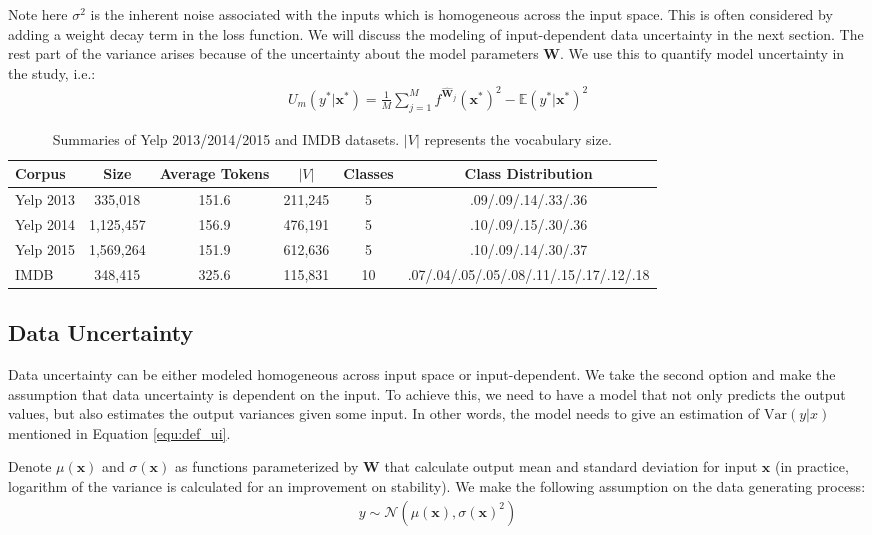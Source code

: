 \documentclass[letterpaper]{article} %
\newcommand{\vect}[1]{\mathbf{#1}}
\newcommand{\matr}[1]{\mathbf{#1}}
\newcommand{\vx}[0]{\vect{x}}
\newcommand{\E}{\mathbb{E}}
\newcommand{\N}{\mathcal{N}}
\newcommand{\mW}[0]{\matr{W}}
\begin{document}
Note here $\sigma^2$ is the inherent noise associated with the inputs which is homogeneous across the input space. This is often considered by adding a weight decay term in the loss function. We will discuss the modeling of input-dependent data uncertainty in the next section. The rest part of the variance arises because of the uncertainty about the model parameters $\mW$. We use this to quantify model uncertainty in the study, i.e.:
\begin{align}
U_m(y^*|\vx^*)=\frac{1}{M}\sum_{j=1}^Mf^{\widehat{\mW}_j}(\vx^*)^2-\E(y^*|\vx^*)^2
\end{align}

\begin{table}[t!]
\begin{center}
\begin{tabular}{lccccc}
\hline
{\bf Corpus} & \bf Size & \bf Average Tokens & $|V|$ & \bf Classes & \bf Class Distribution\\
\hline
Yelp 2013 & 335,018   & 151.6 & 211,245 & 5 & .09/.09/.14/.33/.36 \\
Yelp 2014 & 1,125,457 & 156.9 & 476,191 & 5 & .10/.09/.15/.30/.36 \\
Yelp 2015 & 1,569,264 & 151.9 & 612,636 & 5 & .10/.09/.14/.30/.37\\
IMDB & 348,415 & 325.6 & 115,831 & 10 & .07/.04/.05/.05/.08/.11/.15/.17/.12/.18\\

\hline
\end{tabular}
\end{center}
\caption{\label{tab:sent_datasets} Summaries of Yelp 2013/2014/2015 and IMDB datasets. $|V|$ represents the vocabulary size.}
\end{table}

\subsection{Data Uncertainty}
\label{sec:input_uncertainty}
Data uncertainty can be either modeled homogeneous across input space or input-dependent. We take the second option and make the assumption that data uncertainty is dependent on the input. To achieve this, we need to have a model that not only predicts the output values, but also estimates the output variances given some input. In other words, the model needs to give an estimation of $\text{Var}(y|x)$ mentioned in Equation \ref{equ:def_ui}.

Denote $\mu(\vx)$ and $\sigma(\vx)$ as functions parameterized by $\mW$ that calculate output mean and standard deviation for input $\vx$ (in practice, logarithm of the variance is calculated for an improvement on stability). We make the following assumption on the data generating process:
\begin{align}
y\sim\N\left(\mu(\vx), \sigma(\vx)^2\right)
\end{align}
\end{document}
